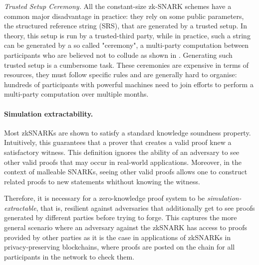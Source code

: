   
\noindent \emph{Trusted Setup Ceremony.} All the  constant-size zk-SNARK schemes have a common major disadvantage in practice:
they rely on some public parameters, the structured reference string (SRS), that are generated by a trusted setup. In theory, this setup is run by a trusted-third party, while in practice, such a string can be generated by a so called "ceremony", a multi-party
computation between participants who are believed not to collude as shown in \cite{AFRICACRYPT:ABLSZ19,EPRINT:BowGabMie17,SP:BCGTV15}.
Generating such trusted setup is a cumbersome task. 
These ceremonies are expensive in terms of resources, they must follow specific rules and are generally hard to organise: hundreds of participants with powerful machines need to join efforts to perform a multi-party computation over multiple months. 



\paragraph{Simulation extractability.}
Most zkSNARKs are shown to satisfy a standard knowledge soundness property. 
Intuitively, this guarantees that
a prover that creates a valid proof knew a satisfactory witness.  
This definition ignores the ability of an adversary to see other valid proofs that may occur in real-world applications. 
Moreover, in the context of malleable SNARKs, seeing other valid proofs allows one to construct related proofs to new statements whithout knowing the witness. 

Therefore, it is necessary for a zero-knowledge proof system to be \emph{simulation-extractable}, that is, resilient against adversaries that additionally get to see proofs generated by different parties before trying to forge.
This captures the more general scenario where an adversary against the zkSNARK has access to proofs provided by other parties as it is the case in applications of
zkSNARKs in privacy-preserving blockchains,  where proofs are posted on the chain for all
participants in the network to check them. 

